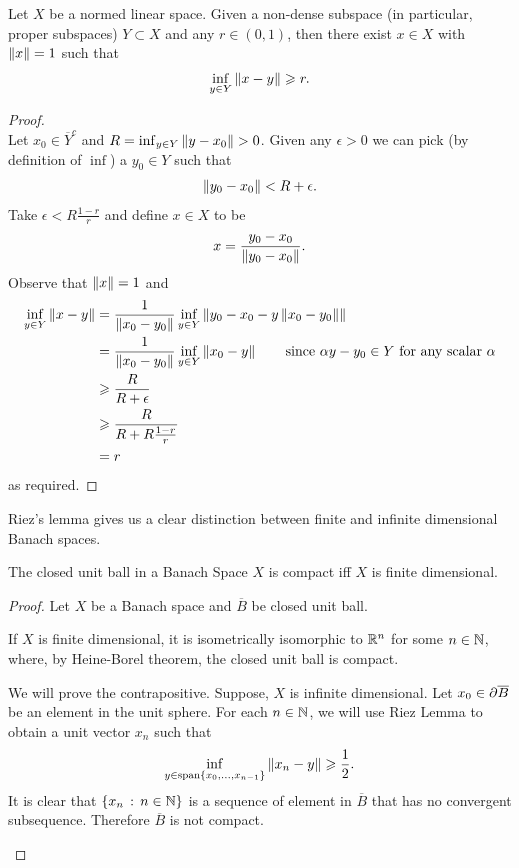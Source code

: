 \documentclass[12pt]{article}
\begin{document}
\begin{flemma}
    Let $X$ be a normed linear space. Given a non-dense subspace (in particular, proper subspaces) $Y \subset X$ and any $r \in (0, 1)$, then there exist $x \in X$ with $\norm[x] = 1$ such that 
    \begin{align*}
    \inf_{y \in Y} \norm[x - y] \geq r. 
    \end{align*}
\end{flemma}
\begin{proof}\hfill \\
    Let $x_0 \in \overline{Y}^c$ and $R = \inf_{y \in Y}\norm[y - x_0] > 0$. Given any $\epsilon > 0$ we can pick (by definition of $\inf$) a $y_0 \in Y$ such that 
    \begin{align*}
    \norm[y_0 - x_0] < R + \epsilon. 
    \end{align*}
    Take $\epsilon < R \frac{1 - r}{r}$ and define $x \in X$ to be
    \begin{align*}
    x = \frac{y_0 - x_0}{\norm[y_0 - x_0]}. 
    \end{align*}
    Observe that $\norm[x] = 1$ and 
    \begin{align*}
    \inf_{y \in Y} \norm[x - y] 
    &= \frac{1}{\norm[x_0 - y_0]} \inf_{y \in Y} \norm[y_0 - x_0 - y \norm[x_0 - y_0] ] \\
    &= \frac{1}{\norm[x_0 - y_0]} \inf_{y \in Y} \norm[x_0 - y] \tag*{since $\alpha y - y_0 \in Y$ for any scalar $\alpha$} \\
    &\geq \frac{R}{R + \epsilon} \\
    &\geq \frac{R}{R + R \frac{1 - r}{r}} \\
    &= r
    \end{align*}
    as required. 
\end{proof}



Riez's lemma gives us a clear distinction between finite and infinite dimensional Banach spaces. 
\begin{fcor}
    The closed unit ball in a Banach Space $X$ is compact iff $X$ is finite dimensional. 
\end{fcor}
\begin{proof}
    Let $X$ be a Banach space and $\overline{B}$ be closed unit ball. 
    \begin{case}[ $\Longleftarrow$ ] If $X$ is finite dimensional, it is isometrically isomorphic to $\R^n$ for some $n \in \N$, where, by Heine-Borel theorem, the closed unit ball is compact. 
    \end{case}
    
    
    \begin{case}[$\implies$] We will prove the contrapositive. Suppose, $X$ is infinite dimensional. Let $x_0 \in \p \overline{B}$ be an element in the unit sphere. For each $n \in \N$, we will use Riez Lemma to obtain a unit vector $x_n$ such that 
        $$\inf_{y \in \mathrm{span}\set{x_0, \dots, x_{n - 1}}} \norm[x_n - y] \geq \frac{1}{2}. $$
        It is clear that $\set{x_n \wh n \in \N}$ is a sequence of element in $\overline{B}$ that has no convergent subsequence. Therefore $\overline{B}$ is not compact. 
    \end{case}
\end{proof}
\end{document}
